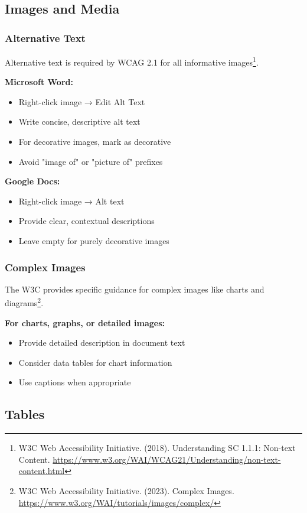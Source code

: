 \subsection{Images and Media}

\subsubsection{Alternative Text}
Alternative text is required by WCAG 2.1 for all informative images\footnote{W3C Web Accessibility Initiative. (2018). Understanding SC 1.1.1: Non-text Content. \url{https://www.w3.org/WAI/WCAG21/Understanding/non-text-content.html}}.

\textbf{Microsoft Word:}
\begin{itemize}
\item Right-click image → Edit Alt Text
\item Write concise, descriptive alt text
\item For decorative images, mark as decorative
\item Avoid "image of" or "picture of" prefixes
\end{itemize}

\textbf{Google Docs:}
\begin{itemize}
\item Right-click image → Alt text
\item Provide clear, contextual descriptions
\item Leave empty for purely decorative images
\end{itemize}

\subsubsection{Complex Images}
The W3C provides specific guidance for complex images like charts and diagrams\footnote{W3C Web Accessibility Initiative. (2023). Complex Images. \url{https://www.w3.org/WAI/tutorials/images/complex/}}.

\textbf{For charts, graphs, or detailed images:}
\begin{itemize}
\item Provide detailed description in document text
\item Consider data tables for chart information
\item Use captions when appropriate
\end{itemize}

\subsection{Tables}

